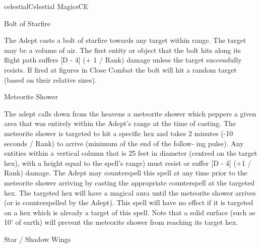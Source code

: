 \begin{College}[1.3]{celestial}{Celestial Magics}{CE}
\begin{spell}[S-3]{Bolt of Starfire }

\begin{effects}
The Adept casts a bolt of starfire towards any target within range.
The target may be a volume of air.  The first entity or object that
the bolt hits along its flight path suffers [D - 4] (+ 1 / Rank)
damage unless the target successfully resists.  If fired at figures in
Close Combat the bolt will hit a random target (based on their
relative sizes).
\end{effects}
\end{spell}

\begin{spell}[S-4]{Meteorite Shower }

\begin{effects}
The adept calls down from the heavens a meteorite shower which peppers
a given area that was entirely within the Adept’s range at the time of
casting.  The meteorite shower is targeted to hit a specific hex and
takes 2 minutes (-10 seconds / Rank) to arrive (minimum of the end of
the follow- ing pulse).  Any entities within a vertical column that is
25 feet in diameter (centred on the target hex), with a height equal
to the spell’s range) must resist or suffer [D - 4] (+1 / Rank)
damage.  The Adept may counterspell this spell at any time prior to
the meteorite shower arriving by casting the appropriate counterspell
at the targeted hex.  The targeted hex will have a magical aura until
the meteorite shower arrives (or is counterspelled by the Adept).
This spell will have no effect if it is targeted on a hex which is
already a target of this spell.  Note that a solid surface (such as
10’ of earth) will prevent the meteorite shower from reaching its
target hex.
\end{effects}
\end{spell}

\begin{spell}[S-5]{Star / Shadow Wings}


\end{spell}
\end{College}
